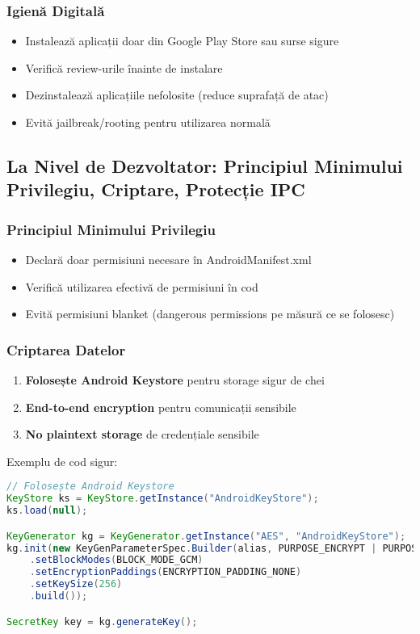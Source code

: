 \documentclass[11pt,a4paper,twocolumn]{article}
\theoremstyle{definition}
\theoremstyle{plain}
\theoremstyle{remark}
\begin{document}
\subsubsection{Igienă Digitală}
\begin{itemize}
    \item Instalează aplicații doar din Google Play Store sau surse sigure
    \item Verifică review-urile înainte de instalare
    \item Dezinstalează aplicațiile nefolosite (reduce suprafață de atac)
    \item Evită jailbreak/rooting pentru utilizarea normală
\end{itemize}

\subsection{La Nivel de Dezvoltator: Principiul Minimului Privilegiu, Criptare, Protecție IPC}

\subsubsection{Principiul Minimului Privilegiu}
\begin{itemize}
    \item Declară doar permisiuni necesare în AndroidManifest.xml
    \item Verifică utilizarea efectivă de permisiuni în cod
    \item Evită permisiuni blanket (dangerous permissions pe măsură ce se folosesc)
\end{itemize}

\subsubsection{Criptarea Datelor}
\begin{enumerate}
    \item \textbf{Folosește Android Keystore} pentru storage sigur de chei
    \item \textbf{End-to-end encryption} pentru comunicații sensibile
    \item \textbf{No plaintext storage} de credențiale sensibile
\end{enumerate}

Exemplu de cod sigur:
\begin{lstlisting}[language=Java, basicstyle=\ttfamily\tiny]
// Folosește Android Keystore
KeyStore ks = KeyStore.getInstance("AndroidKeyStore");
ks.load(null);

KeyGenerator kg = KeyGenerator.getInstance("AES", "AndroidKeyStore");
kg.init(new KeyGenParameterSpec.Builder(alias, PURPOSE_ENCRYPT | PURPOSE_DECRYPT)
    .setBlockModes(BLOCK_MODE_GCM)
    .setEncryptionPaddings(ENCRYPTION_PADDING_NONE)
    .setKeySize(256)
    .build());

SecretKey key = kg.generateKey();
\end{lstlisting}
\end{document}
